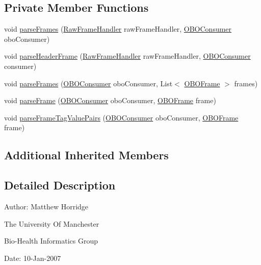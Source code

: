 \subsection*{Private Member Functions}
\begin{DoxyCompactItemize}
\item 
void \hyperlink{classorg_1_1coode_1_1owlapi_1_1obo_1_1parser_1_1_o_w_l_o_b_o_parser_a1d583cf7d32c7a3e0d4bc02ea9828764}{parse\-Frames} (\hyperlink{classorg_1_1coode_1_1owlapi_1_1obo_1_1parser_1_1_raw_frame_handler}{Raw\-Frame\-Handler} raw\-Frame\-Handler, \hyperlink{classorg_1_1coode_1_1owlapi_1_1obo_1_1parser_1_1_o_b_o_consumer}{O\-B\-O\-Consumer} obo\-Consumer)
\item 
void \hyperlink{classorg_1_1coode_1_1owlapi_1_1obo_1_1parser_1_1_o_w_l_o_b_o_parser_a0e0a9b7001e3e12f92f2a3714801f34d}{parse\-Header\-Frame} (\hyperlink{classorg_1_1coode_1_1owlapi_1_1obo_1_1parser_1_1_raw_frame_handler}{Raw\-Frame\-Handler} raw\-Frame\-Handler, \hyperlink{classorg_1_1coode_1_1owlapi_1_1obo_1_1parser_1_1_o_b_o_consumer}{O\-B\-O\-Consumer} consumer)
\item 
void \hyperlink{classorg_1_1coode_1_1owlapi_1_1obo_1_1parser_1_1_o_w_l_o_b_o_parser_ae0dfda9b4f989acfe3b0d15f60459158}{parse\-Frames} (\hyperlink{classorg_1_1coode_1_1owlapi_1_1obo_1_1parser_1_1_o_b_o_consumer}{O\-B\-O\-Consumer} obo\-Consumer, List$<$ \hyperlink{classorg_1_1coode_1_1owlapi_1_1obo_1_1parser_1_1_o_b_o_frame}{O\-B\-O\-Frame} $>$ frames)
\item 
void \hyperlink{classorg_1_1coode_1_1owlapi_1_1obo_1_1parser_1_1_o_w_l_o_b_o_parser_a6b78ed953de5e821d6ebd681d07b8f90}{parse\-Frame} (\hyperlink{classorg_1_1coode_1_1owlapi_1_1obo_1_1parser_1_1_o_b_o_consumer}{O\-B\-O\-Consumer} obo\-Consumer, \hyperlink{classorg_1_1coode_1_1owlapi_1_1obo_1_1parser_1_1_o_b_o_frame}{O\-B\-O\-Frame} frame)
\item 
void \hyperlink{classorg_1_1coode_1_1owlapi_1_1obo_1_1parser_1_1_o_w_l_o_b_o_parser_ab7afeb33d3989a3a588ca0b6715f5136}{parse\-Frame\-Tag\-Value\-Pairs} (\hyperlink{classorg_1_1coode_1_1owlapi_1_1obo_1_1parser_1_1_o_b_o_consumer}{O\-B\-O\-Consumer} obo\-Consumer, \hyperlink{classorg_1_1coode_1_1owlapi_1_1obo_1_1parser_1_1_o_b_o_frame}{O\-B\-O\-Frame} frame)
\end{DoxyCompactItemize}
\subsection*{Additional Inherited Members}


\subsection{Detailed Description}
Author\-: Matthew Horridge\par
 The University Of Manchester\par
 Bio-\/\-Health Informatics Group\par
 Date\-: 10-\/\-Jan-\/2007\par
\par
 

